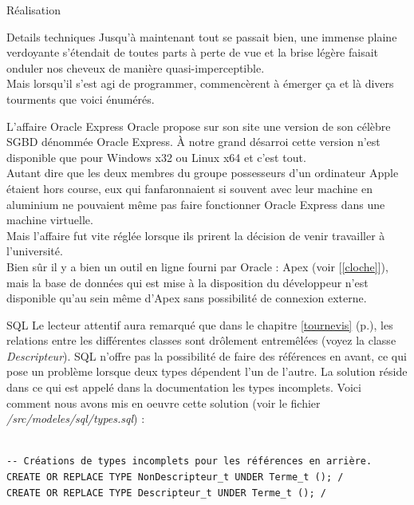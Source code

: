 \documentclass[a4paper, 12pt]{report}
\begin{document}
\begin{chapter}{Réalisation}
	\begin{section}{Details techniques}
		Jusqu'à maintenant tout se passait bien, une immense plaine verdoyante s'étendait de toutes parts à perte de vue et la brise légère faisait
		onduler nos cheveux de manière quasi-imperceptible.\\ Mais lorsqu'il s'est agi de programmer, commencèrent à émerger ça et là divers tourments
		que voici énumérés.

		\begin{subsection}{L'affaire Oracle Express}
			Oracle propose sur son site une version de son célèbre SGBD dénommée Oracle Express. À notre grand désarroi cette version n'est disponible
			que pour Windows x32 ou Linux x64 et c'est tout.\\
			Autant dire que les deux membres du groupe possesseurs d'un ordinateur Apple étaient hors course, eux qui fanfaronnaient si souvent avec leur
			machine en aluminium ne pouvaient même pas faire fonctionner Oracle Express dans une machine virtuelle.\\
			Mais l'affaire fut vite réglée lorsque ils prirent la décision de venir travailler à l'université.\\

			Bien sûr il y a bien un outil en ligne fourni par Oracle : Apex (voir [\ref{cloche}]), mais la base de données qui est mise à la disposition du
			développeur n'est disponible qu'au sein même d'Apex sans possibilité de connexion externe.
		\end{subsection}

		\begin{subsection}{SQL}
			Le lecteur attentif aura remarqué que dans le chapitre \ref{tournevis} (p.\pageref{tournevis}),
			les relations entre les différentes classes sont drôlement entremêlées (voyez la classe \emph{Descripteur}).
			SQL n'offre pas la possibilité de faire des références en avant,
			ce qui pose un problème lorsque deux types dépendent l'un de l'autre. La solution réside dans ce qui est appelé dans la documentation les types
			incomplets. Voici comment nous avons mis en oeuvre cette solution (voir le fichier \emph{/src/modeles/sql/types.sql}) : \\~\\
			\begin{verbatim}
-- Créations de types incomplets pour les références en arrière.
CREATE OR REPLACE TYPE NonDescripteur_t UNDER Terme_t (); /
CREATE OR REPLACE TYPE Descripteur_t UNDER Terme_t (); /


\end{verbatim}
\end{subsection}
\end{section}
\end{chapter}
\end{document}
